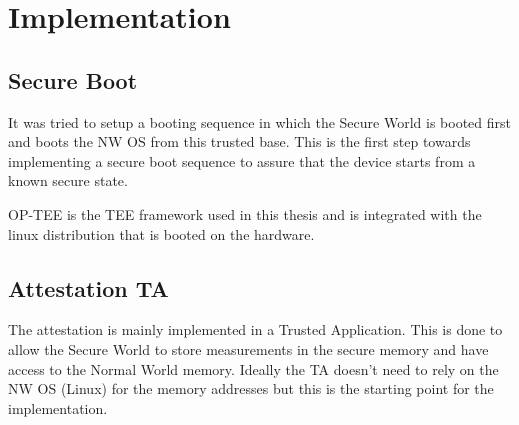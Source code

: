 \documentclass{report}
\begin{document}
\chapter{Implementation}

\section{Secure Boot}

It was tried to setup a booting sequence in which the Secure World is booted first and boots the NW OS from this trusted base. This is the first step towards implementing a secure boot sequence to assure that the device starts from a known secure state.
\medskip

OP-TEE is the TEE framework used in this thesis and is integrated with the linux distribution that is booted on the hardware.

\section{Attestation TA}

The attestation is mainly implemented in a Trusted Application. This is done to allow the Secure World to store measurements in the secure memory and have access to the Normal World memory. Ideally the TA doesn't need to rely on the NW OS (Linux) for the memory addresses but this is the starting point for the implementation.
\end{document}
